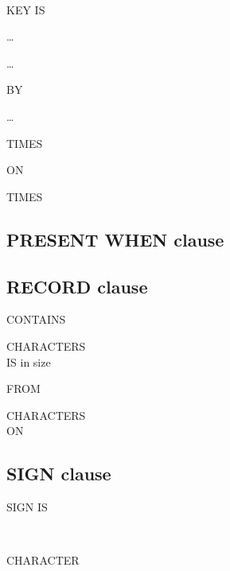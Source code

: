 \begin{0-1}
    \begin{1=}
       \\
    \end{1=}
    KEY IS
    \begin{1=}
      \identifier
    \end{1=}\ldots
\end{0-1}\ldots

\begin{0-1}
   BY
  \begin{1=}
    \cobolindexname
  \end{1=}\ldots
\end{0-1}

 \integer
\begin{0-1}
   \integer
\end{0-1}
TIMES
\begin{0-1}
   ON \identifier
\end{0-1}
\begin{0-1}
   \integer
\end{0-1}

 \integer TIMES

\subsection{PRESENT WHEN clause}
  \condition

\subsection{RECORD clause}
\begin{1=}
  CONTAINS \integer
  \begin{0-1}
     \integer
  \end{0-1}
  CHARACTERS \\
  IS  in size
  \begin{0-1}
    FROM \integer
  \end{0-1}
  \begin{0-1}
     \integer
  \end{0-1}
  CHARACTERS \\\qquad
   ON \identifier
\end{1=}

\subsection{SIGN clause}
SIGN IS
\begin{1=}
   \\
\end{1=}
\begin{0-1}
   CHARACTER
\end{0-1}

